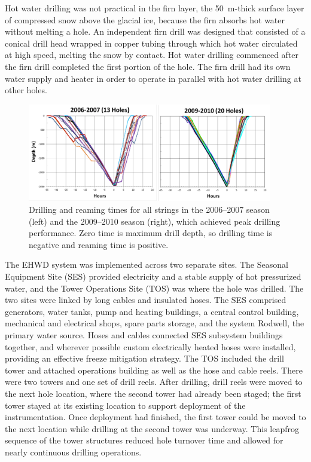 Hot water drilling was not practical in the firn layer, the 50~m-thick surface layer of
compressed snow above the glacial ice, because the firn
absorbs hot water without melting a hole.  An independent
firn drill was designed that consisted of a conical drill
head wrapped in copper tubing through which hot water circulated at high speed,
melting the snow by contact. Hot water drilling commenced after the firn
drill completed the first portion of the hole. The firn drill had its own
water supply and heater in order to operate in parallel with hot water drilling
at other holes.

\begin{figure}[!ht]
 \centering
 \includegraphics[width=0.95\textwidth]{graphics/drill/drill_depthvtime.pdf}
\caption{Drilling and reaming times for all strings in the 2006--2007 season
  (left) and the 2009--2010 season (right), which achieved peak drilling
  performance. Zero time is maximum drill depth, so drilling time is
  negative and reaming time is positive.}
\label{fig:drilldepthtime}
\end{figure}

The EHWD system was implemented across two separate sites.  The Seasonal
Equipment Site (SES) provided electricity and a stable supply of hot
pressurized water, and the Tower Operations Site (TOS) was where the hole
was drilled.  The two sites were linked by long cables and insulated
hoses. The SES comprised generators, water tanks, pump and heating
buildings, a central control building, mechanical and electrical shops,
spare parts storage, and the system Rodwell, the primary water
source. Hoses and cables connected SES subsystem buildings together, and
wherever possible custom electrically heated hoses were installed,
providing an effective freeze mitigation strategy. The TOS included the
drill tower and attached operations building as well as the hose and cable
reels.  There were two towers and one set of drill reels.  After drilling,
drill reels were moved to the next hole location, where the second tower
had already been staged; the first tower stayed at its existing location
to support deployment of the instrumentation.  Once deployment had
finished, the first tower could be moved to the next location while
drilling at the second tower was underway.  This leapfrog sequence of the
tower structures reduced hole turnover time and allowed for nearly
continuous drilling operations.

